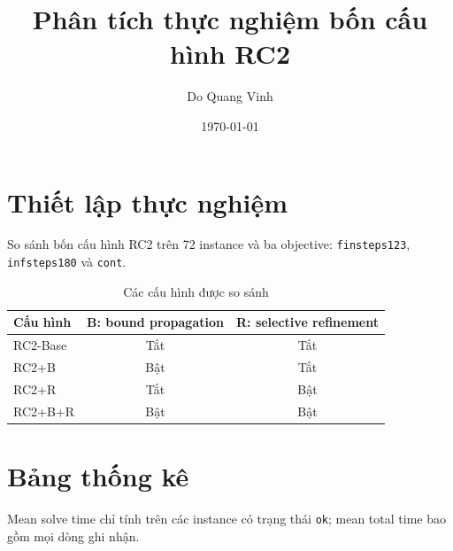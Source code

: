 \documentclass[11pt,a4paper]{article}
\title{Phân tích thực nghiệm bốn cấu hình RC2}
\author{Do Quang Vinh}
\date{\today}
\begin{document}
\maketitle

\section{Thiết lập thực nghiệm}
So sánh bốn cấu hình RC2 trên 72 instance và ba objective: \texttt{finsteps123}, \texttt{infsteps180} và \texttt{cont}.

\begin{table}[H]
\centering
\caption{Các cấu hình được so sánh}
\begin{tabular}{lcc}
\toprule
Cấu hình & B: bound propagation & R: selective refinement \\
\midrule
RC2-Base & Tắt & Tắt \\
RC2+B & Bật & Tắt \\
RC2+R & Tắt & Bật \\
RC2+B+R & Bật & Bật \\
\bottomrule
\end{tabular}
\end{table}

\section{Bảng thống kê}
Mean solve time chỉ tính trên các instance có trạng thái \texttt{ok}; mean total time bao gồm mọi dòng ghi nhận.
\end{document}
